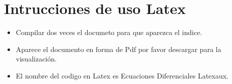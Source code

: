 \documentclass[11pt,a4paper]{article}
\begin{document}
\part{Intrucciones de uso  Latex}
\begin{itemize}
\item Compilar dos veces el documeto para que aparezca el indice.
\item Aparece el documento en forma de Pdf por favor descargar para la visualización.
\item El nombre del codigo en Latex es Ecuaciones Diferenciales Latexaux.
\end{itemize}
\end{document}
